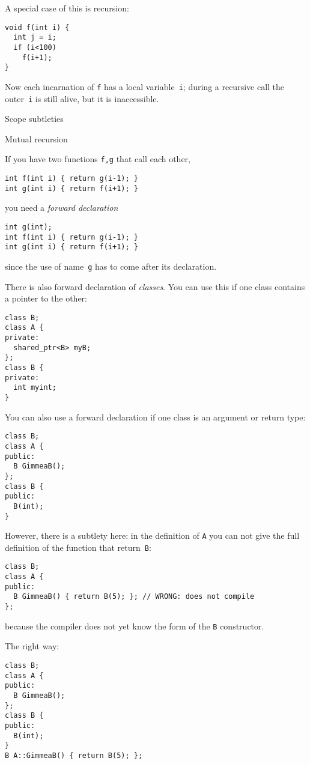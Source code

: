 A special case of this is recursion:
\begin{lstlisting}
void f(int i) {
  int j = i;
  if (i<100)
    f(i+1);
}
\end{lstlisting}
Now each incarnation of \lstinline{f} has a local variable~\lstinline{i}; during a
recursive call the outer~\lstinline{i} is still alive, but it is inaccessible.

 {Scope subtleties}

 {Mutual recursion}

If you have two functions \lstinline{f,g} that call each other,
\begin{lstlisting}
int f(int i) { return g(i-1); }
int g(int i) { return f(i+1); }
\end{lstlisting}
you need a
%
\emph{forward declaration}
%
\begin{lstlisting}
int g(int);
int f(int i) { return g(i-1); }
int g(int i) { return f(i+1); }
\end{lstlisting}
since the use of name~\lstinline{g} has to come after its declaration.

There is also forward declaration of
\emph{classes}.
You can use this if one class contains a pointer to the other:
\begin{lstlisting}
class B;
class A {
private:
  shared_ptr<B> myB;
};
class B {
private:
  int myint;
}
\end{lstlisting}

You can also use a forward declaration if one class is an argument or return type:
\begin{lstlisting}
class B;
class A {
public:
  B GimmeaB();
};
class B {
public:
  B(int);
}
\end{lstlisting}
However, there is a subtlety here:
in the definition of \lstinline{A} you can not give the full definition
of the function that return~\lstinline{B}:
\begin{lstlisting}
class B;
class A {
public:
  B GimmeaB() { return B(5); }; // WRONG: does not compile
};
\end{lstlisting}

because the compiler does not yet know the form of the \lstinline{B} constructor.

The right way:
\begin{lstlisting}
class B;
class A {
public:
  B GimmeaB();
};
class B {
public:
  B(int);
}
B A::GimmeaB() { return B(5); };
\end{lstlisting}

